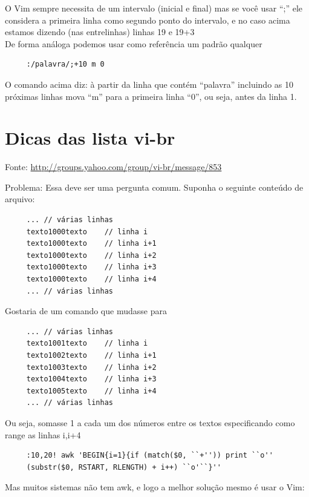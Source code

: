 \documentclass[10pt,a4paper,openany]{book}
\begin{document}
O Vim sempre necessita de um intervalo (inicial e final) mas se você
usar ``;'' ele considera a primeira linha como segundo ponto do
intervalo, e no caso acima estamos dizendo (nas entrelinhas) linhas
19 e 19+3     \\


De forma análoga podemos usar como referência um padrão qualquer

\begin{verbatim}
     :/palavra/;+10 m 0
\end{verbatim}

O comando acima diz: à partir da linha que contém ``palavra'' incluindo as 10 próximas linhas
mova ``m'' para a primeira linha ``0'', ou seja, antes da linha 1.

\section{Dicas das lista vi-br}

 Fonte: \url{http://groups.yahoo.com/group/vi-br/message/853}

 Problema:
 Essa deve ser uma pergunta comum.
 Suponha o seguinte conteúdo de arquivo:

\begin{verbatim}
     ... // várias linhas
     texto1000texto    // linha i
     texto1000texto    // linha i+1
     texto1000texto    // linha i+2
     texto1000texto    // linha i+3
     texto1000texto    // linha i+4
     ... // várias linhas
\end{verbatim}

Gostaria de um comando que mudasse para

\begin{verbatim}
     ... // várias linhas
     texto1001texto    // linha i
     texto1002texto    // linha i+1
     texto1003texto    // linha i+2
     texto1004texto    // linha i+3
     texto1005texto    // linha i+4
     ... // várias linhas
\end{verbatim}

 Ou seja, somasse 1 a cada um dos números entre os textos
 especificando como range as linhas i,i+4

\begin{verbatim}
     :10,20! awk 'BEGIN{i=1}{if (match($0, ``+'')) print ``o''
     (substr($0, RSTART, RLENGTH) + i++) ``o'``}''
\end{verbatim}

 Mas muitos sistemas não tem awk, e logo a melhor solução mesmo é usar o Vim:
\end{document}
